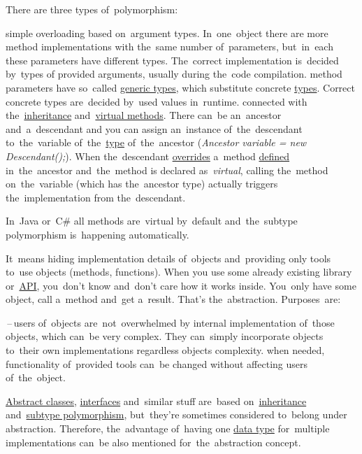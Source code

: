 \noindent There are three types of~polymorphism:
\begin{itemize}
     simple overloading based on~argument types.
             In~one~object there are more method implementations with the~same number of~parameters, but~in~each these parameters have different types.
             The~correct implementation is~decided by~types of provided arguments, usually during the~code compilation.
     method parameters have so~called \hyperref[javagenerics]{generic types}, which substitute concrete \hyperref[datatypes]{types}.
             Correct concrete types are~decided by~used values in~runtime.
    \newpage
     connected with the~\hyperref[inheritance]{inheritance} and~\hyperref[javavirtualmethods]{virtual methods}.
             There can~be an~ancestor and~a~descendant and you can assign an~instance of~the~descendant to~the~variable of~the~\hyperref[datatype]{type} of~the~ancestor (\textit{Ancestor variable = new Descendant();}).
             When the~descendant \hyperref[javaoverride]{overrides} a~method \hyperref[declarationdefinition]{defined} in~the~ancestor and~the~method is declared as~\textit{virtual}, calling the~method on~the~variable (which has the~ancestor type) actually triggers the~implementation from the~descendant.
\end{itemize}

\warning In~Java or~C\# all methods are~virtual by~default and~the~subtype polymorphism is~happening automatically.

\label{abstraction}
It~means hiding implementation details of~objects and~providing only tools to~use objects (methods, functions).
When you use some already existing library or~\hyperref[api]{API}, you~don't know and~don't care how it works inside.
You~only have some object, call a~method and~get a~result.
That's the~abstraction.
Purposes~are:
\begin{itemize}
    \,--\,users of~objects are~not~overwhelmed by internal implementation of~those objects, which can~be very complex.
            They can~simply incorporate objects to~their own implementations regardless objects complexity.
     when needed, functionality of~provided tools can~be changed without affecting users of~the~object.
\end{itemize}

\warning \hyperref[javaabstractclasses]{Abstract classes}, \hyperref[javainterfaces]{interfaces} and~similar stuff are~based on~\hyperref[inheritance]{inheritance} and~\hyperref[polymorphism]{subtype polymorphism}, but~they're sometimes considered to~belong under abstraction.
Therefore, the~advantage of~having one \hyperref[datatypes]{data type} for~multiple implementations can~be also mentioned for~the~abstraction concept.

